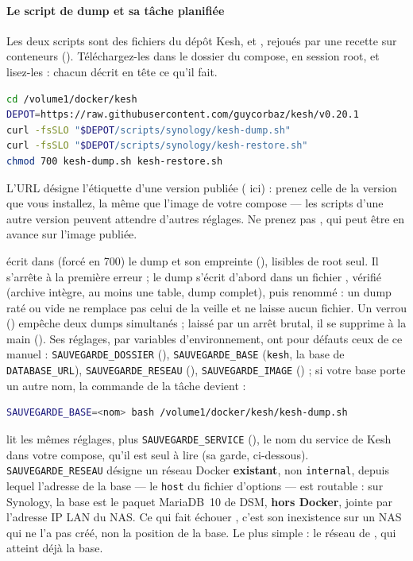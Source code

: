 \documentclass[a4paper,11pt,oneside]{article}
\begin{document}
\paragraph{Le script de dump et sa tâche planifiée}

Les deux scripts sont des fichiers du dépôt Kesh,  et , rejoués par une recette sur conteneurs (). Téléchargez-les dans le dossier du compose, en session root, et lisez-les : chacun décrit en tête ce qu'il fait.

\begin{lstlisting}[language=bash]
cd /volume1/docker/kesh
DEPOT=https://raw.githubusercontent.com/guycorbaz/kesh/v0.20.1
curl -fsSLO "$DEPOT/scripts/synology/kesh-dump.sh"
curl -fsSLO "$DEPOT/scripts/synology/kesh-restore.sh"
chmod 700 kesh-dump.sh kesh-restore.sh
\end{lstlisting}

L'URL désigne l'étiquette d'une version publiée ( ici) : prenez celle de la version que vous installez, la même que l'image de votre compose --- les scripts d'une autre version peuvent attendre d'autres réglages. Ne prenez pas , qui peut être en avance sur l'image publiée.

 écrit dans  (forcé en 700) le dump et son empreinte (), lisibles de root seul. Il s'arrête à la première erreur ; le dump s'écrit d'abord dans un fichier , vérifié (archive intègre, au moins une table, dump complet), puis renommé : un dump raté ou vide ne remplace pas celui de la veille et ne laisse aucun fichier. Un verrou () empêche deux dumps simultanés ; laissé par un arrêt brutal, il se supprime à la main (). Ses réglages, par variables d'environnement, ont pour défauts ceux de ce manuel : \texttt{SAUVEGARDE\_DOSSIER} (), \texttt{SAUVEGARDE\_BASE} (\texttt{kesh}, la base de \texttt{DATABASE\_URL}), \texttt{SAUVEGARDE\_RESEAU} (), \texttt{SAUVEGARDE\_IMAGE} () ; si votre base porte un autre nom, la commande de la tâche devient :

\begin{lstlisting}[language=bash]
SAUVEGARDE_BASE=<nom> bash /volume1/docker/kesh/kesh-dump.sh
\end{lstlisting}

 lit les mêmes réglages, plus \texttt{SAUVEGARDE\_SERVICE} (), le nom du service de Kesh dans votre compose, qu'il est seul à lire (sa garde, ci-dessous). \texttt{SAUVEGARDE\_RESEAU} désigne un réseau Docker \textbf{existant}, non \texttt{internal}, depuis lequel l'adresse de la base --- le \texttt{host} du fichier d'options --- est routable : sur Synology, la base est le paquet MariaDB~10 de DSM, \textbf{hors Docker}, jointe par l'adresse IP LAN du NAS. Ce qui fait échouer , c'est son inexistence sur un NAS qui ne l'a pas créé, non la position de la base. Le plus simple : le réseau de , qui atteint déjà la base.
\end{document}
